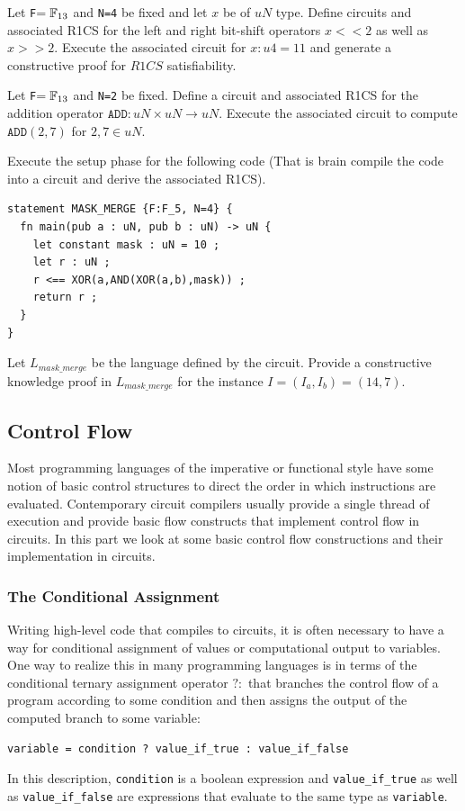 \begin{exercise}
Let \texttt{F}$=\mathbb{F}_{13}$ and \texttt{N=4} be fixed and let $x$ be of $uN$ type. Define circuits and associated R1CS for the left and right bit-shift operators $x<<2$ as well as $x>>2$. Execute the associated circuit for $x : u4 = 11$ and generate a constructive proof for $R1CS$ satisfiability.
\end{exercise}
\begin{exercise}
Let \texttt{F}$=\mathbb{F}_{13}$ and \texttt{N=2} be fixed. Define a circuit and associated R1CS for the addition operator $\mathtt{ADD}: uN \times uN \to uN$. Execute the associated circuit to compute $\mathtt{ADD}(2,7)$ for $2,7\in uN$.
\end{exercise}
\begin{exercise} Execute the setup phase for the following  code (That is brain compile the code into a circuit and derive the associated R1CS). 
\begin{lstlisting}
statement MASK_MERGE {F:F_5, N=4} {
  fn main(pub a : uN, pub b : uN) -> uN {
    let constant mask : uN = 10 ;
    let r : uN ;
    r <== XOR(a,AND(XOR(a,b),mask)) ;
    return r ;
  }
}
\end{lstlisting}
Let $L_{mask\_merge}$ be the language defined by the circuit. Provide a constructive knowledge proof in $L_{mask\_merge}$ for the instance $I=(I_a, I_b) = (14, 7)$.
\end{exercise}
\subsection{Control Flow} Most programming languages of the imperative or functional style have some notion of basic control structures to direct the order in which instructions are evaluated. Contemporary circuit compilers usually provide a single thread of execution and provide basic flow constructs that implement control flow in circuits. In this part we look at some basic control flow constructions and their implementation in circuits.
\subsubsection{The Conditional Assignment} Writing high-level code that compiles to circuits, it is often necessary to have a way for conditional assignment of values or computational output to variables. One way to realize this in many programming languages is in terms of the conditional ternary assignment operator $?:$ that branches the control flow of a program according to some condition and then assigns the output of the computed branch to some variable: 
\begin{lstlisting}
variable = condition ? value_if_true : value_if_false  
\end{lstlisting}
In this description, \texttt{condition} is a boolean expression and \texttt{value\_if\_true} as well as \texttt{value\_if\_false} are expressions that evaluate to the same type as \texttt{variable}.

